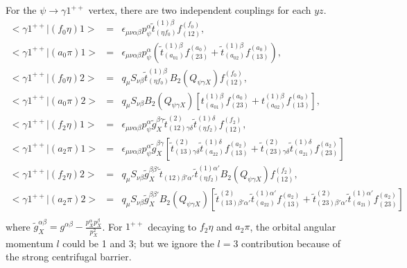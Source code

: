 For the $\psi\to\gamma 1^{++}$ vertex, there are two independent
couplings for each $yz$.
\begin{eqnarray}
<\gamma 1^{++}|(f_0\eta)1> \!&=&\!
\epsilon_{\mu\nu\alpha\beta}p_\psi^{\alpha} \tilde
t^{(1)\beta}_{(\eta f_0)}f_{(12)}^{(f_0)}, \\
<\gamma 1^{++}|(a_0\pi)1> \!&=&\!
\epsilon_{\mu\nu\alpha\beta}p_\psi^{\alpha} (\tilde
t^{(1)\beta}_{(a_01)} f_{(23)}^{(a_0)} + \tilde
t^{(1)\beta}_{(a_02)} f_{(13)}^{(a_0)}), \\
<\gamma 1^{++}|(f_0\eta)2> \!&=&\! q_\mu S_{\nu\beta}
\tilde t^{(1)\beta}_{(\eta f_0)} B_2(Q_{\psi\gamma X})f_{(12)}^{(f_0)}, \\
<\gamma 1^{++}|(a_0\pi)2> \!&=&\!  q_\mu S_{\nu\beta}
B_2(Q_{\psi\gamma X}) [t^{(1)\beta}_{(a_01)}f_{(23)}^{(a_0)}
+t^{(1)\beta}_{(a_02)}f_{(13)}^{(a_0)}],  \\
<\gamma 1^{++}|(f_2\eta)1> \!&=&\!
\epsilon_{\mu\nu\alpha\beta}p_\psi^{\alpha}
\tilde{g}_X^{\beta\gamma}\tilde t^{(2)}_{(12)\gamma\delta}
\tilde t^{(1)\delta}_{(\eta f_2)} f_{(12)}^{(f_2)}, \\
<\gamma 1^{++}|(a_2\pi)1> \!&=&\!
\epsilon_{\mu\nu\alpha\beta}p_\psi^{\alpha}\tilde{g}_X^{\beta\gamma}
[\tilde t^{(2)}_{(13)\gamma\delta} \tilde t^{(1)\delta}_{(a_22)}
f_{(13)}^{(a_2)} +\tilde t^{(2)}_{(23)\gamma\delta}\tilde
t^{(1)\delta}_{(a_21)}
f_{(23)}^{(a_2)}] \\
<\gamma 1^{++}|(f_2\eta)2> \!&=&\! q_\mu S_{\nu\beta}
\tilde{g}_X^{\beta\beta'}\tilde t_{(12)\beta'\alpha'} \tilde
t^{(1)\alpha'}_{(\eta f_2)}B_2(Q_{\psi\gamma X})
f_{(12)}^{(f_2)},\\
<\gamma 1^{++}|(a_2\pi)2> \!&=&\! q_\mu S_{\nu\beta}
\tilde{g}_X^{\beta\beta'}B_2(Q_{\psi\gamma X}) [\tilde
t^{(2)}_{(13)\beta'\alpha'}\tilde t^{(1)\alpha'}_{(a_22)}
f_{(13)}^{(a_2)}+\tilde t^{(2)}_{(23)\beta'\alpha'}\tilde
t^{(1)\alpha'}_{(a_21)} f_{(23)}^{(a_2)}] \nonumber\\
\end{eqnarray}
where $\tilde g_X^{\alpha\beta}=g^{\alpha\beta}-\frac{p_X^\alpha
p_X^\beta}{p_X^2}$. For $1^{++}$ decaying to $f_2\eta$ and
$a_2\pi$, the orbital angular momentum $l$ could be 1 and 3; but
we ignore the $l=3$ contribution because of the strong centrifugal
barrier.


